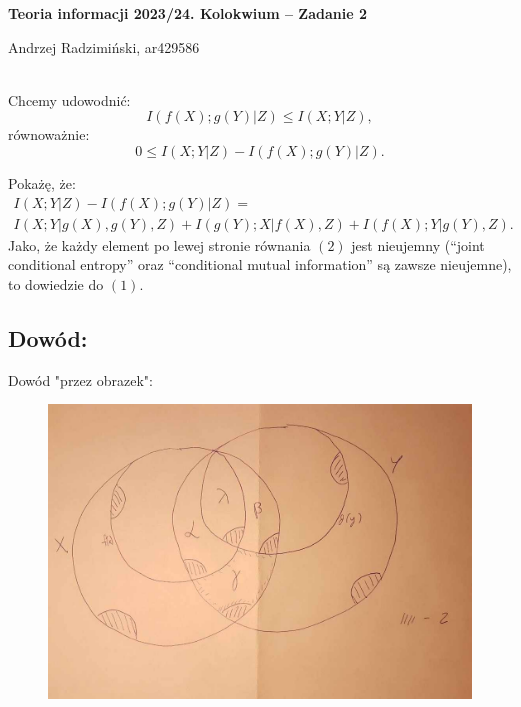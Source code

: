 



\setlength{\parindent}{0pt}
\noindent

{\bf Teoria informacji 2023/24. Kolokwium -- Zadanie 2}

Andrzej Radzimiński, ar429586
\\

\ \\

\newcommand{\ot}{\frac{1}{3}}
\newcommand{\twt}{\frac{2}{3}}

\renewcommand*{\arraystretch}{1.5}

Chcemy udowodnić:
\begin{equation}
	I(f(X) ; g(Y) | Z) \leq I(X ; Y | Z),
\end{equation}
równoważnie:
$$
	0 \leq I(X ; Y | Z) - I(f(X) ; g(Y) | Z).
$$

Pokażę, że:
\begin{multline}
	I(X ; Y | Z) - I(f(X) ; g(Y) | Z) = \\
	I(X ; Y | g(X), g(Y), Z) +
	I(g(Y) ; X | f(X), Z) +
	I(f(X) ; Y | g(Y), Z).
\end{multline}
Jako, że każdy element po lewej stronie równania $(2)$ jest nieujemny (``joint conditional entropy'' oraz ``conditional mutual information'' są zawsze nieujemne), to dowiedzie do $(1)$.

\subsection*{Dowód:}

Dowód "przez obrazek":

\begin{figure}[ht!]
	\centering
	\includegraphics[width=160mm]{obrazek.jpg}
\end{figure}


